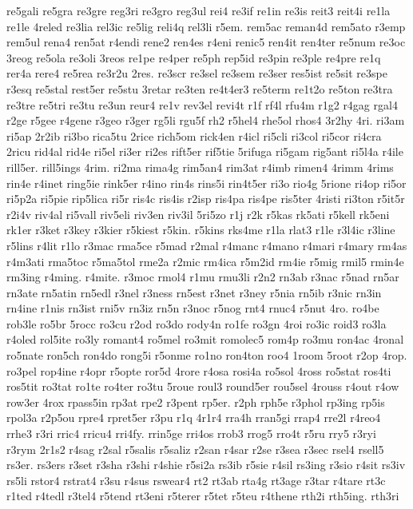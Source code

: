 {re5gali
re5gra
re3gre
reg3ri
re3gro
reg3ul
rei4
re3if
re1in
re3is
reit3
reit4i
re1la
re1le
4reled
re3lia
rel3ic
re5lig
reli4q
rel3li
r5em.
rem5ac
reman4d
rem5ato
r3emp
rem5ul
rena4
ren5at
r4endi
rene2
ren4es
r4eni
renic5
ren4it
ren4ter
re5num
re3oc
3reog
re5ola
re3oli
3reos
re1pe
re4per
re5ph
rep5id
re3pin
re3ple
re4pre
re1q
rer4a
rere4
re5rea
re3r2u
2res.
re3scr
re3sel
re3sem
re3ser
res5ist
re5sit
re3spe
r3esq
re5stal
rest5er
re5stu
3retar
re3ten
re4t4er3
re5term
re1t2o
re5ton
re3tra
re3tre
re5tri
re3tu
re3un
reur4
re1v
rev3el
revi4t
r1f
rf4l
rfu4m
r1g2
r4gag
rgal4
r2ge
r5gee
r4gene
r3geo
r3ger
rg5li
rgu5f
rh2
r5hel4
rhe5ol
rhos4
3r2hy
4ri.
ri3am
ri5ap
2r2ib
ri3bo
rica5tu
2rice
rich5om
rick4en
r4icl
ri5cli
ri3col
ri5cor
ri4cra
2ricu
rid4al
rid4e
ri5el
ri3er
ri2es
rift5er
rif5tie
5rifuga
ri5gam
rig5ant
ri5l4a
r4ile
rill5er.
rill5ings
4rim.
ri2ma
rima4g
rim5an4
rim3at
r4imb
rimen4
4rimm
4rims
rin4e
r4inet
ring5ie
rink5er
r4ino
rin4s
rins5i
rin4t5er
ri3o
rio4g
5rione
ri4op
ri5or
ri5p2a
ri5pie
rip5lica
ri5r
ris4c
ris4is
r2isp
ris4pa
ris4pe
ris5ter
4risti
ri3ton
r5it5r
r2i4v
riv4al
ri5vall
riv5eli
riv3en
riv3il
5ri5zo
r1j
r2k
r5kas
rk5ati
r5kell
rk5eni
rk1er
r3ket
r3key
r3kier
r5kiest
r5kin.
r5kins
rks4me
r1la
rlat3
r1le
r3l4ic
r3line
r5lins
r4lit
r1lo
r3mac
rma5ce
r5mad
r2mal
r4manc
r4mano
r4mari
r4mary
rm4as
r4m3ati
rma5toc
r5ma5tol
rme2a
r2mic
rm4ica
r5m2id
rm4ie
r5mig
rmil5
rmin4e
rm3ing
r4ming.
r4mite.
r3moc
rmol4
r1mu
rmu3li
r2n2
rn3ab
r3nac
r5nad
rn5ar
rn3ate
rn5atin
rn5edl
r3nel
r3ness
rn5est
r3net
r3ney
r5nia
rn5ib
r3nic
rn3in
rn4ine
r1nis
rn3ist
rni5v
rn3iz
rn5n
r3noc
r5nog
rnt4
rnuc4
r5nut
4ro.
ro4be
rob3le
ro5br
5rocc
ro3cu
r2od
ro3do
rody4n
ro1fe
ro3gn
4roi
ro3ic
roid3
ro3la
r4oled
rol5ite
ro3ly
romant4
ro5mel
ro3mit
romolec5
rom4p
ro3mu
ron4ac
4ronal
ro5nate
ron5ch
ron4do
rong5i
r5onme
ro1no
ron4ton
roo4
1room
5root
r2op
4rop.
ro3pel
rop4ine
r4opr
r5opte
ror5d
4rore
r4osa
rosi4a
ro5sol
4ross
ro5stat
ros4ti
ros5tit
ro3tat
ro1te
ro4ter
ro3tu
5roue
roul3
round5er
rou5sel
4rouss
r4out
r4ow
row3er
4rox
rpass5in
rp3at
rpe2
r3pent
rp5er.
r2ph
rph5e
r3phol
rp3ing
rp5is
rpol3a
r2p5ou
rpre4
rpret5er
r3pu
r1q
4r1r4
rra4h
rran5gi
rrap4
rre2l
r4reo4
rrhe3
r3ri
rric4
rricu4
rri4fy.
rrin5ge
rri4os
rrob3
rrog5
rro4t
r5ru
rry5
r3ryi
r3rym
2r1s2
r4sag
r2sal
r5salis
r5saliz
r2san
r4sar
r2se
r3sea
r3sec
rsel4
rsell5
rs3er.
rs3ers
r3set
r3sha
r3shi
r4shie
r5si2a
rs3ib
r5sie
r4sil
rs3ing
r3sio
r4sit
rs3iv
rs5li
rstor4
rstrat4
r3su
r4sus
rswear4
rt2
rt3ab
rta4g
rt3age
r3tar
r4tare
rt3c
r1ted
r4tedl
r3tel4
r5tend
rt3eni
r5terer
r5tet
r5teu
r4thene
rth2i
rth5ing.
rth3ri
}
